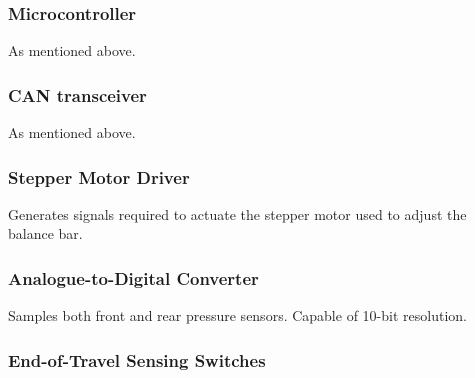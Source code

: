 \subsubsection{Microcontroller}

As mentioned above.


\subsubsection{CAN transceiver}

As mentioned above.


\subsubsection{Stepper Motor Driver}

Generates signals required to actuate the stepper motor used to adjust
the balance bar.


\subsubsection{Analogue-to-Digital Converter}

Samples both front and rear pressure sensors. Capable of 10-bit resolution.


\subsubsection{End-of-Travel Sensing Switches}